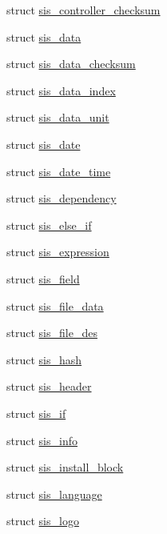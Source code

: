 \begin{DoxyCompactItemize}
struct \mbox{\hyperlink{structeka2l1_1_1loader_1_1sis__controller__checksum}{sis\+\_\+controller\+\_\+checksum}}
\item 
struct \mbox{\hyperlink{structeka2l1_1_1loader_1_1sis__data}{sis\+\_\+data}}
\item 
struct \mbox{\hyperlink{structeka2l1_1_1loader_1_1sis__data__checksum}{sis\+\_\+data\+\_\+checksum}}
\item 
struct \mbox{\hyperlink{structeka2l1_1_1loader_1_1sis__data__index}{sis\+\_\+data\+\_\+index}}
\item 
struct \mbox{\hyperlink{structeka2l1_1_1loader_1_1sis__data__unit}{sis\+\_\+data\+\_\+unit}}
\item 
struct \mbox{\hyperlink{structeka2l1_1_1loader_1_1sis__date}{sis\+\_\+date}}
\item 
struct \mbox{\hyperlink{structeka2l1_1_1loader_1_1sis__date__time}{sis\+\_\+date\+\_\+time}}
\item 
struct \mbox{\hyperlink{structeka2l1_1_1loader_1_1sis__dependency}{sis\+\_\+dependency}}
\item 
struct \mbox{\hyperlink{structeka2l1_1_1loader_1_1sis__else__if}{sis\+\_\+else\+\_\+if}}
\item 
struct \mbox{\hyperlink{structeka2l1_1_1loader_1_1sis__expression}{sis\+\_\+expression}}
\item 
struct \mbox{\hyperlink{structeka2l1_1_1loader_1_1sis__field}{sis\+\_\+field}}
\item 
struct \mbox{\hyperlink{structeka2l1_1_1loader_1_1sis__file__data}{sis\+\_\+file\+\_\+data}}
\item 
struct \mbox{\hyperlink{structeka2l1_1_1loader_1_1sis__file__des}{sis\+\_\+file\+\_\+des}}
\item 
struct \mbox{\hyperlink{structeka2l1_1_1loader_1_1sis__hash}{sis\+\_\+hash}}
\item 
struct \mbox{\hyperlink{structeka2l1_1_1loader_1_1sis__header}{sis\+\_\+header}}
\item 
struct \mbox{\hyperlink{structeka2l1_1_1loader_1_1sis__if}{sis\+\_\+if}}
\item 
struct \mbox{\hyperlink{structeka2l1_1_1loader_1_1sis__info}{sis\+\_\+info}}
\item 
struct \mbox{\hyperlink{structeka2l1_1_1loader_1_1sis__install__block}{sis\+\_\+install\+\_\+block}}
\item 
struct \mbox{\hyperlink{structeka2l1_1_1loader_1_1sis__language}{sis\+\_\+language}}
\item 
struct \mbox{\hyperlink{structeka2l1_1_1loader_1_1sis__logo}{sis\+\_\+logo}}

\end{DoxyCompactItemize}
